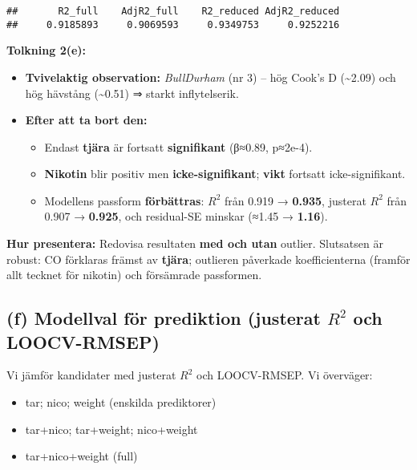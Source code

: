 \documentclass[
  11pt,
]{article}
\providecommand{\tightlist}{%
  \setlength{\itemsep}{0pt}\setlength{\parskip}{0pt}}
\begin{document}
\begin{verbatim}
##       R2_full    AdjR2_full    R2_reduced AdjR2_reduced 
##     0.9185893     0.9069593     0.9349753     0.9252216
\end{verbatim}

\textbf{Tolkning 2(e):}

\begin{itemize}
\item
  \textbf{Tvivelaktig observation:} \emph{BullDurham} (nr 3) -- hög
  Cook's D (\textasciitilde2.09) och hög hävstång (\textasciitilde0.51)
  ⇒ starkt inflytelserik.
\item
  \textbf{Efter att ta bort den:}

  \begin{itemize}
  \tightlist
  \item
    Endast \textbf{tjära} är fortsatt \textbf{signifikant} (β≈0.89,
    p≈2e-4).
  \item
    \textbf{Nikotin} blir positiv men \textbf{icke-signifikant};
    \textbf{vikt} fortsatt icke-signifikant.
  \item
    Modellens passform \textbf{förbättras}: \(R^2\) från 0.919 →
    \textbf{0.935}, justerat \(R^2\) från 0.907 → \textbf{0.925}, och
    residual-SE minskar (≈1.45 → \textbf{1.16}).
  \end{itemize}
\end{itemize}

\textbf{Hur presentera:} Redovisa resultaten \textbf{med och utan}
outlier. Slutsatsen är robust: CO förklaras främst av \textbf{tjära};
outlieren påverkade koefficienterna (framför allt tecknet för nikotin)
och försämrade passformen.

\subsection{\texorpdfstring{(f) Modellval för prediktion (justerat
\(R^2\) och
LOOCV-RMSEP)}{(f) Modellval för prediktion (justerat R\^{}2 och LOOCV-RMSEP)}}\label{f-modellval-fuxf6r-prediktion-justerat-r2-och-loocv-rmsep}

Vi jämför kandidater med justerat \(R^2\) och LOOCV-RMSEP. Vi överväger:

\begin{itemize}
\tightlist
\item
  tar; nico; weight (enskilda prediktorer)
\item
  tar+nico; tar+weight; nico+weight
\item
  tar+nico+weight (full)
\end{itemize}
\end{document}
